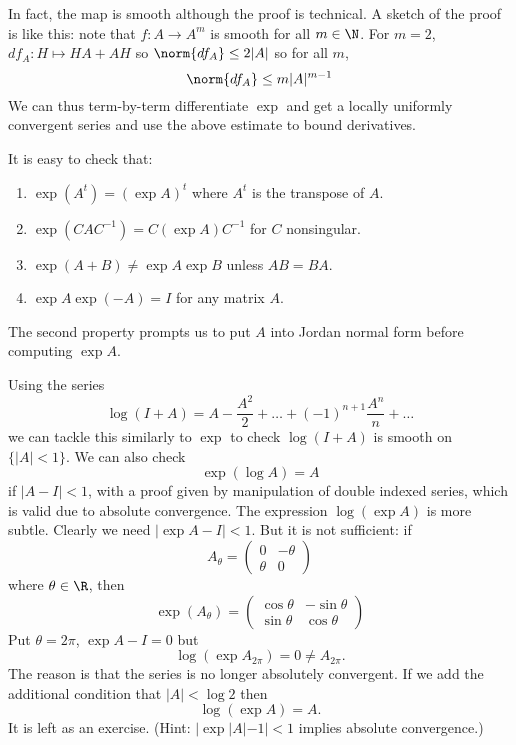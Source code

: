 \documentclass[a4paper]{article}
\begin{document}
In fact, the map is smooth although the proof is technical. A sketch of the proof is like this: note that \(f: A \to A^m\) is smooth for all \(m \in \N\). For \(m = 2\), \(df_A: H \mapsto HA + AH\) so \(\norm{df_A} \leq 2 |A|\) so for all \(m\),
\[
  \norm{df_A} \leq m |A|^{m - 1}
\]
We can thus term-by-term differentiate \(\exp\) and get a locally uniformly convergent series and use the above estimate to bound derivatives.

It is easy to check that:
\begin{enumerate}
\item \(\exp (A^t) = (\exp A)^t\) where \(A^t\) is the transpose of \(A\).
\item \(\exp (CAC^{-1}) = C (\exp A) C^{-1}\) for \(C\) nonsingular.
\item \(\exp (A + B) \neq \exp A \exp B\) unless \(AB = BA\).
\item \(\exp A \exp (-A) = I\) for any matrix \(A\).
\end{enumerate}

The second property prompts us to put \(A\) into Jordan normal form before computing \(\exp A\).

Using the series
\[
  \log (I + A) = A - \frac{A^2}{2} + \dots + (-1)^{n + 1} \frac{A^n}{n} + \dots
\]
we can tackle this similarly to \(\exp\) to check \(\log(I + A)\) is smooth on \(\{|A| < 1\}\). We can also check
\[
  \exp (\log A) = A
\]
if \(|A - I| < 1\), with a proof given by manipulation of double indexed series, which is valid due to absolute convergence. The expression \(\log (\exp A)\) is more subtle. Clearly we need \(|\exp A - I| < 1\). But it is not sufficient: if
\[
  A_\theta =
  \begin{pmatrix}
    0 & -\theta \\
    \theta & 0
  \end{pmatrix}
\]
where \(\theta \in \R\), then
\[
  \exp(A_\theta) =
  \begin{pmatrix}
    \cos \theta & - \sin \theta \\
    \sin \theta & \cos \theta
  \end{pmatrix}
\]
Put \(\theta = 2\pi\), \(\exp A - I = 0\) but
\[
  \log (\exp A_{2\pi}) = 0 \neq A_{2\pi}.
\]
The reason is that the series is no longer absolutely convergent. If we add the additional condition that \(|A| < \log 2\) then
\[
  \log (\exp A) = A.
\]
It is left as an exercise. (Hint: \(|\exp |A| - 1| < 1\) implies absolute convergence.)
\end{document}

